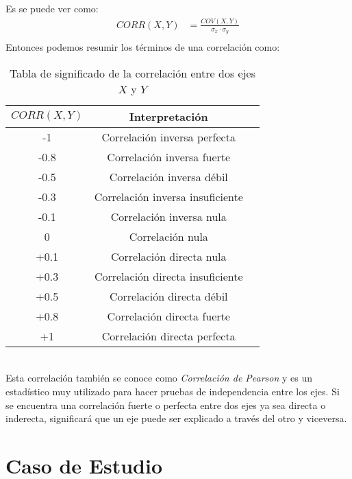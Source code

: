 \documentclass{article}
\begin{document}
Es se puede ver como:
\begin{equation}
    \begin{aligned}
        CORR(X, Y) &= \frac{COV(X, Y)}{\sigma_x \cdot \sigma_y} \\
    \end{aligned}
\end{equation}
Entonces podemos resumir los términos de una correlación como:
\begin{table}[h!]
    \centering
    \begin{tabular}{|c|c|c|}
    \hline
    $CORR(X, Y)$ & \textbf{Interpretación} \\ \hline
    -1 & Correlación inversa perfecta \\ \hline
    -0.8 & Correlación inversa fuerte \\ \hline
    -0.5 & Correlación inversa débil \\ \hline
    -0.3 & Correlación inversa insuficiente \\ \hline
    -0.1 & Correlación inversa nula \\ \hline
    0 & Correlación nula \\ \hline
    +0.1 & Correlación directa nula \\ \hline
    +0.3 & Correlación directa insuficiente \\ \hline
    +0.5 & Correlación directa débil \\ \hline
    +0.8 & Correlación directa fuerte \\ \hline
    +1 & Correlación directa perfecta \\ \hline
    \end{tabular}
    \caption{Tabla de significado de la correlación entre dos ejes $X$ y $Y$}
\end{table}
\\
Esta correlación también se conoce como \textit{Correlación de Pearson} y es un estadístico muy utilizado para hacer pruebas de independencia entre los ejes. Si se encuentra una correlación fuerte o perfecta entre dos ejes ya sea directa o inderecta, significará que un eje puede ser explicado a través del otro y viceversa.

\section{Caso de Estudio}
\end{document}
